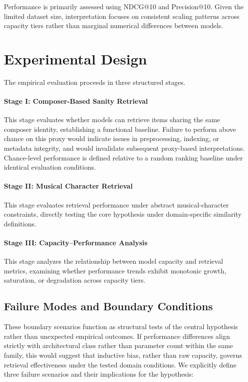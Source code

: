Performance is primarily assessed using NDCG@10 and Precision@10. Given the limited dataset size, interpretation focuses on consistent scaling patterns across capacity tiers rather than marginal numerical differences between models.


\section{Experimental Design}
The empirical evaluation proceeds in three structured stages.

\paragraph{Stage I: Composer-Based Sanity Retrieval}
This stage evaluates whether models can retrieve items sharing the same composer identity, establishing a functional baseline.
Failure to perform above chance on this proxy would indicate issues in preprocessing, indexing, or metadata integrity, and would invalidate subsequent proxy-based interpretations.
Chance-level performance is defined relative to a random ranking baseline under identical evaluation conditions.

\paragraph{Stage II: Musical Character Retrieval}
This stage evaluates retrieval performance under abstract musical-character constraints, directly testing the core hypothesis under domain-specific similarity definitions.

\paragraph{Stage III: Capacity–Performance Analysis}
This stage analyzes the relationship between model capacity and retrieval metrics, examining whether performance trends exhibit monotonic growth, saturation, or degradation across capacity tiers.




\subsection{Failure Modes and Boundary Conditions}
These boundary scenarios function as structural tests of the central hypothesis rather than unexpected empirical outcomes.
If performance differences align strictly with architectural class rather than parameter count within the same family, this would suggest that inductive bias, rather than raw capacity, governs retrieval effectiveness under the tested domain conditions.
We explicitly define three failure scenarios and their implications for the hypothesis:

